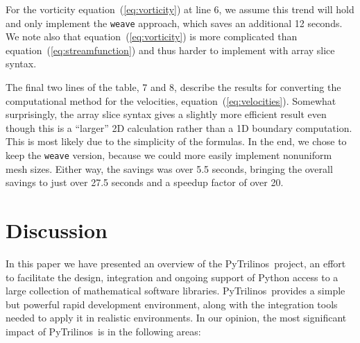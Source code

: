 \documentclass[acmtocl]{acmtrans2m}
\newcommand{\PyTrilinos}{{PyTrilinos}}
\begin{document}
For the vorticity equation~(\ref{eq:vorticity}) at line 6, we assume
this trend will hold and only implement the {\tt weave} approach,
which saves an additional 12 seconds.  We note also that
equation~(\ref{eq:vorticity}) is more complicated than
equation~(\ref{eq:streamfunction}) and thus harder to implement with
array slice syntax.

The final two lines of the table, 7 and 8, describe the results for
converting the computational method for the velocities,
equation~(\ref{eq:velocities}).  Somewhat surprisingly, the array
slice syntax gives a slightly more efficient result even though this
is a ``larger'' 2D calculation rather than a 1D boundary computation.
This is most likely due to the simplicity of the formulas.  In the
end, we chose to keep the {\tt weave} version, because we could more
easily implement nonuniform mesh sizes.  Either way, the savings was
over 5.5 seconds, bringing the overall savings to just over 27.5
seconds and a speedup factor of over 20.

\section{Discussion}
\label{sec:discussion}

In this paper we have presented an overview of the
\PyTrilinos\ project, an effort to facilitate the design, integration
and ongoing support of Python access to a large collection of
mathematical software libraries.  \PyTrilinos\ provides a simple but
powerful rapid development environment, along with the integration
tools needed to apply it in realistic environments.  In our opinion,
the most significant impact of \PyTrilinos\ is in the following areas:
\end{document}
